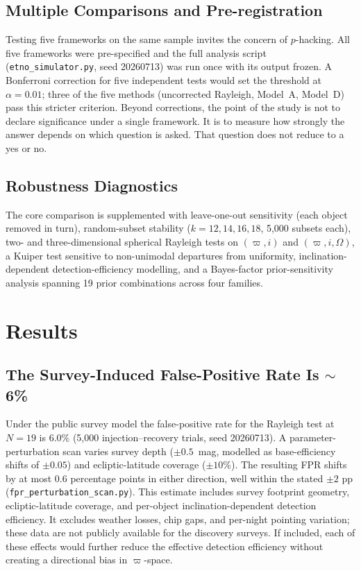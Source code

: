 \documentclass{aa}
\begin{document}
\subsection{Multiple Comparisons and Pre-registration}

Testing five frameworks on the same sample invites the concern of $p$-hacking. All five frameworks were pre-specified and the full analysis script (\texttt{etno\_simulator.py}, seed 20260713) was run once with its output frozen. A Bonferroni correction for five independent tests would set the threshold at $\alpha = 0.01$; three of the five methods (uncorrected Rayleigh, Model~A, Model~D) pass this stricter criterion. Beyond corrections, the point of the study is not to declare significance under a single framework. It is to measure how strongly the answer depends on which question is asked. That question does not reduce to a yes or no.

\subsection{Robustness Diagnostics}

The core comparison is supplemented with leave-one-out sensitivity (each object removed in turn), random-subset stability ($k=12,14,16,18$, 5,000 subsets each), two- and three-dimensional spherical Rayleigh tests on $(\varpi, i)$ and $(\varpi, i, \Omega)$, a Kuiper test sensitive to non-unimodal departures from uniformity, inclination-dependent detection-efficiency modelling, and a Bayes-factor prior-sensitivity analysis spanning 19 prior combinations across four families.

\section{Results}

\subsection{The Survey-Induced False-Positive Rate Is $\sim$6\%}

Under the public survey model the false-positive rate for the Rayleigh test at $N=19$ is $6.0\%$ (5,000 injection--recovery trials, seed 20260713). A parameter-perturbation scan varies survey depth ($\pm0.5$~mag, modelled as base-efficiency shifts of $\pm0.05$) and ecliptic-latitude coverage ($\pm10\%$). The resulting FPR shifts by at most 0.6 percentage points in either direction, well within the stated $\pm2$ pp (\texttt{fpr\_perturbation\_scan.py}). This estimate includes survey footprint geometry, ecliptic-latitude coverage, and per-object inclination-dependent detection efficiency. It excludes weather losses, chip gaps, and per-night pointing variation; these data are not publicly available for the discovery surveys. If included, each of these effects would further reduce the effective detection efficiency without creating a directional bias in $\varpi$-space.
\end{document}
